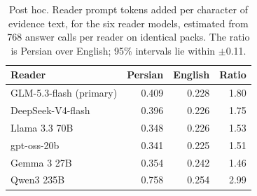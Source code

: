 \begin{table}[t]
\centering
\footnotesize
\setlength{\tabcolsep}{4pt}
\begin{tabular}{@{}p{2.6cm}rrr@{}}
\toprule
Reader & Persian & English & Ratio \\
\midrule
GLM-5.3-flash (primary) & 0.409 & 0.228 & 1.80 \\
DeepSeek-V4-flash & 0.396 & 0.226 & 1.75 \\
Llama 3.3 70B & 0.348 & 0.226 & 1.53 \\
gpt-oss-20b & 0.341 & 0.225 & 1.51 \\
Gemma 3 27B & 0.354 & 0.242 & 1.46 \\
Qwen3 235B & 0.758 & 0.254 & 2.99 \\
\bottomrule
\end{tabular}
\caption{Post hoc. Reader prompt tokens added per character of evidence text, for the six reader models, estimated from 768 answer calls per reader on identical packs. The ratio is Persian over English; 95\% intervals lie within $\pm$0.11.}
\label{tab:tokenizers}
\end{table}

